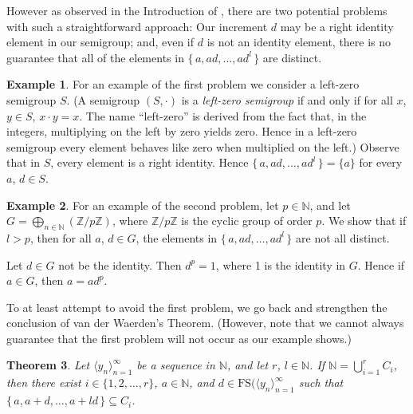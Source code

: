 \documentclass[12pt]{article}
\theoremstyle{plain}
\newtheorem{thm}{Theorem}[section]
\theoremstyle{definition}
\newtheorem{example}[thm]{Example}
\newcommand{\la}{\langle}
\newcommand{\ra}{\rangle}
\newcommand{\bbN}{\mathbb{N}}
\newcommand{\bbZ}{\mathbb{Z}}
\begin{document}
However as observed in the Introduction of \cite{Bergelson:1992fk},
there are two potential problems with such a straightforward
approach: Our increment $d$ may be a right identity element in our
semigroup; and, even if $d$ is not an identity element, there is no
guarantee that all of the elements in $\{\, a, ad, \ldots, ad^l \,\}$
are distinct. 

\begin{example}
  For an example of the first problem we consider a left-zero
  semigroup $S$.
  (A semigroup $(S, \cdot)$ is a \textsl{left-zero semigroup} if and
  only if for all $x$, $y \in S$, $x \cdot y = x$.
  The name ``left-zero'' is derived from the fact that, in the
  integers, multiplying on the left by zero yields zero.  
  Hence in a left-zero semigroup every element behaves like zero when
  multiplied on the left.)
  Observe that in $S$, every element is a right identity. 
  Hence $\{\, a, ad, \ldots, ad^l \,\} = \{a\}$ for every $a$, $d \in S$.
\end{example}

\begin{example}
  For an example of the second problem, let $p \in \bbN$, and let $G =
  \bigoplus_{n \in \bbN} (\bbZ/p\bbZ)$, where $\bbZ/p\bbZ$ is the
  cyclic group of order $p$.
  We show that if $l > p$, then for all $a$, $d \in G$, the elements
  in $\{\, a, ad, \ldots, ad^l \,\}$ are not all distinct.

  Let $d \in G$ not be the identity. 
  Then $d^p = 1$, where 1 is the identity in $G$. 
  Hence if $a \in G$, then $a = ad^p$. 
\end{example}

To at least attempt to avoid the first problem, we go back and
strengthen the conclusion of van der Waerden's Theorem.
(However, note that we cannot always guarantee that the first problem
will not occur as our example shows.)

\begin{thm}
  Let $\la y_n \ra_{n=1}^\infty$ be a sequence in $\bbN$, and let $r$,
  $l \in \bbN$.
  If $\bbN = \bigcup_{i=1}^r C_i$, then there exist $i \in \{1, 2,
  \ldots, r\}$, $a \in \bbN$, and $d \in \mathrm{FS}(\la y_n
  \ra_{n=1}^\infty$ such that $\{\, a, a+d, \ldots, a+ld \,\}
  \subseteq C_i$.
\end{thm}
\end{document}
